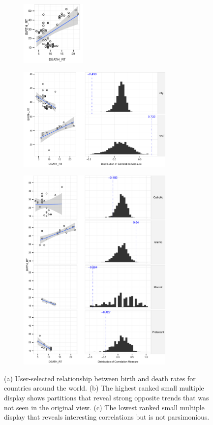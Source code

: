\begin{figure}
 \centering 
	 \begin{subfigure}{1.25in}
		\includegraphics[width=1.25in]{images/DEATH_RT-BIRTH_RT.pdf}
		  \caption{}
		 \label{fig:informative_all}
	\end{subfigure}
	\begin{subfigure}{3in}
		\includegraphics[width=3in]{images/6_84034106410344-URBAN.pdf}
		 \label{fig:informative_sm}
		  \caption{}
	 \end{subfigure}
	\begin{subfigure}{3in}
		\includegraphics[width=3in]{images/2_48595929670884-LEADER.pdf}
		  \caption{}
		 \label{fig:informative_sm_big}
	 \end{subfigure}
	  \caption{(a) User-selected relationship between birth and death rates for countries around the world. (b) The highest ranked small multiple display shows partitions that reveal strong opposite trends that was not seen in the original view. (c) The lowest ranked small multiple display that reveals interesting correlations but is not parsimonious.}
\end{figure}
